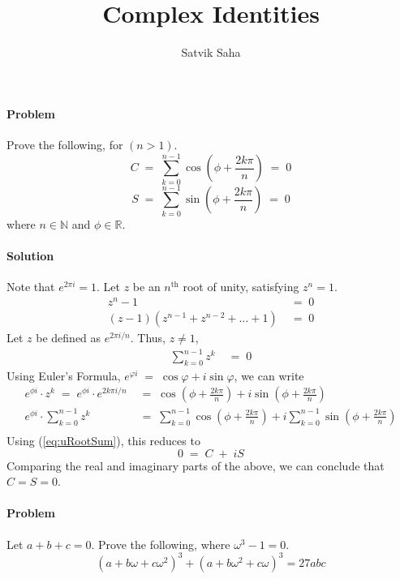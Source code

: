 \documentclass[a4paper, 11pt, reqno]{article}
\title{Complex Identities}
\author{Satvik Saha}
\date{}
\newcounter{prob}
\def\problem{\stepcounter{prob}\paragraph{Problem \arabic{prob}}}
\def\solution{\paragraph{Solution}}
\begin{document}
	\maketitle

	\problem
	Prove the following, for $(n > 1)$.
	\begin{equation*}
		C \; = \;  \sum_{k=0}^{n-1} \cos \left( \phi + \frac{2k\pi}{n}  \right) \; = \; 0 
	\end{equation*}
	\begin{equation*}
		S \; = \;  \sum_{k=0}^{n-1} \sin \left( \phi + \frac{2k\pi}{n}  \right) \; = \; 0 
	\end{equation*}
	where $n \in \mathbb{N}$ and $\phi \in \mathbb{R}$.
	
	\solution
	Note that $e^{2\pi i} = 1$.
	Let $z$ be an $n^{\text{th}}$ root of unity, satisfying $z^{n} = 1$.
	\begin{align*}
		z^{n} - 1 \; &= \; 0	\\
		(z - 1)(z^{n-1} + z^{n-2} + \dots + 1) \; &= \; 0 
	\end{align*}
	Let $z$ be defined as $e^{2\pi i/n}$.
	Thus, $z \neq 1$,
	\begin{align}
		\sum_{k=0}^{n-1} z^{k} \; &= \; 0	\label{eq:uRootSum}
	\end{align}
	Using Euler's Formula, $e^{\varphi i} \; = \; \cos\varphi + i\sin\varphi$, we can write
	\begin{align*}
		e^{\phi i}\cdot z^{k} \; = \; e^{\phi i} \cdot  e^{2k\pi i / n}
				\; &= \;  \cos\left(\phi + \frac{2k\pi}{n}\right) + i\sin\left(\phi + \frac{2k\pi}{n}\right) \\
		e^{\phi i}\cdot \sum_{k=0}^{n-1} z^{k} \; &= \; 
				   \sum_{k=0}^{n-1} \cos\left(\phi + \frac{2k\pi}{n}\right)
				+ i\sum_{k=0}^{n-1} \sin\left(\phi + \frac{2k\pi}{n}\right) \\
	\end{align*}
	Using (\ref{eq:uRootSum}), this reduces to
	\begin{equation*}
		\boxed{0	\; = \; 	C \;+\; iS}
	\end{equation*}
	Comparing the real and imaginary parts of the above, we can conclude that $C = S = 0$.

	\problem
	Let $a + b + c = 0$. Prove the following, where $\omega^3 - 1 = 0$.
	\begin{equation*}
		(a + b\omega + c\omega ^2)^3 + (a + b\omega ^2 + c\omega)^3 = 27abc
	\end{equation*}
	
\end{document}
